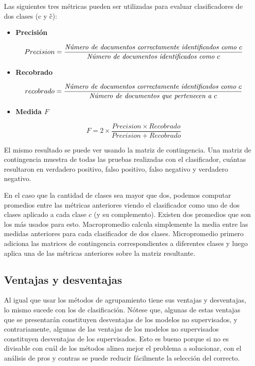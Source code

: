 \documentclass{llncs}
\begin{document}
			Las siguientes tres m\'etricas pueden ser utilizadas para evaluar clasificadores de dos clases (c y \~c):	
					
			\begin{itemize}
				
				\item\textbf{Precisi\'on}
				
				\[
				Precision = \frac{\emph{N\'umero de documentos correctamente identificados como $c$} }{\emph{N\'umero de documentos identificados como $c$}}
				\]
				
				\item\textbf{Recobrado}
				
				\[
				recobrado = \frac{\emph{N\'umero de documentos correctamente identificados como $c$} }{\emph{N\'umero de documentos que pertenecen a $c$}}
				\]
				
				\item\textbf{Medida $F$} 
				
				\[
					F = 2 \times  \frac{Precision \times Recobrado}{Precision + Recobrado}
				\]
				
				
			\end{itemize}
			
			El mismo resultado se puede ver usando la matriz de contingencia. Una matriz de contingencia muestra de todas las pruebas realizadas con el clasificador, cu\'antas resultaron en verdadero positivo, falso positivo, falso negativo y verdadero negativo.
			
			En el caso que la cantidad de clases sea mayor que dos, podemos computar promedios entre las m\'etricas anteriores viendo el clasificador como uno de dos clases aplicado a cada clase $c$ (y su complemento). Existen dos promedios que son los m\'as usados para esto. Macropromedio calcula simplemente la media entre las medidas anteriores para cada clasificador de dos clases. Micropromedio primero adiciona las matrices de contingencia correspondientes a diferentes clases y luego aplica una de las m\'etricas anteriores sobre la matriz resultante. 
			
			
	\subsection{Ventajas y desventajas}
		Al igual que usar los m\'etodos de agrupamiento tiene sus ventajas y desventajas, lo mismo sucede con los de clasificaci\'on. N\'otese que, algunas de estas ventajas que se presentar\'an constituyen desventajas de los modelos no supervisados, y contrariamente, algunas de las ventajas de los modelos no supervisados constituyen desventajas de los supervisados. Esto es bueno porque si no es divisable con cu\'al de los m\'etodos alinea mejor el problema a solucionar, con el an\'alisis de pros y contras se puede reducir f\'acilmente la selecci\'on del correcto. 
		
\end{document}
